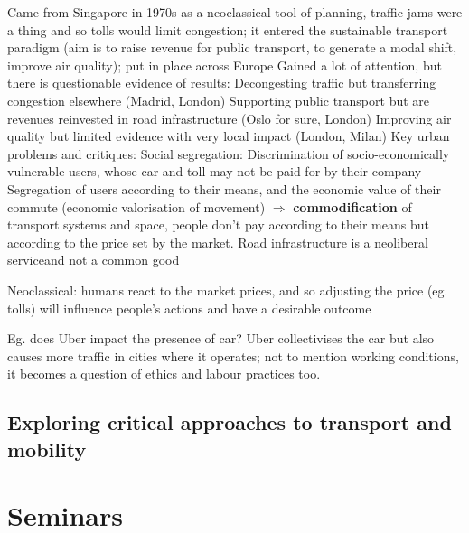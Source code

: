 \documentclass{article}
\begin{document}
\begin{outline}
	\1 Came from Singapore in 1970s as a neoclassical tool of planning, traffic jams were a thing and so tolls would limit congestion; it entered the sustainable transport paradigm (aim is to raise revenue for public transport, to generate a modal shift, improve air quality); put in place across Europe
	\1 Gained a lot of attention, but there is questionable evidence of results: 
		\2 Decongesting traffic but transferring congestion elsewhere (Madrid, London)
		\2 Supporting public transport but are revenues reinvested in road infrastructure (Oslo for sure, London)
		\2 Improving air quality but limited evidence with very local impact (London, Milan)
	\1 Key urban problems and critiques:
		\2 Social segregation: 
			\3 Discrimination of socio-economically vulnerable users, whose car and toll may not be paid for by their company
			\3 Segregation of users according to their means, and the economic value of their commute (economic valorisation of movement)
			\3 $\Rightarrow$ \textbf{commodification} of transport systems and space, people don't pay according to their means but according to the price set by the market. Road infrastructure is a neoliberal serviceand not a common good
		

\end{outline}
Neoclassical: humans react to the market prices, and so adjusting the price (eg. tolls) will influence people's actions and have a desirable outcome

Eg. does Uber impact the presence of car? Uber collectivises the car but also causes more traffic in cities where it operates; not to mention working conditions, it becomes a question of ethics and labour practices too.

\subsection{Exploring critical approaches to transport and mobility}

\begin{outline}
	\1 
\end{outline}

\begin{outline}
	\1 
\end{outline}


\section{Seminars}
\end{document}
